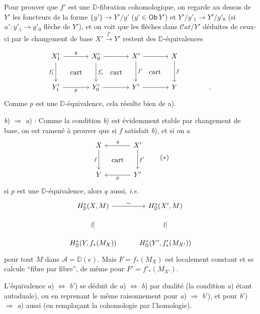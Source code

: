 \documentclass[11pt]{article}
\newcommand{\printedpage}[1]{\marginpar{\footnotesize p.~#1}}
\newcommand{\msp}[1]{\marginpar{\footnotesize [#1]}}
\newcommand{\DD}{\mathbb{D}}
\newcommand{\Ob}{\mathsf{Ob}}
\newcommand{\Cat}{\mathcal{C}at}
\begin{document}
\printedpage{49}

Pour prouver que $f'$ est une $\DD$-fibration cohomologique, on regarde au dessus de $Y'$ les foncteurs de la forme $\{y'\} \to Y'/y'$ ($y' \in \Ob\, Y'$) et $Y'/y'_1 \to Y'/y'_0$ (si $u' : y'_1 \to y'_0$ flèche de $Y'$), et on voit que les flèches dans $\Cat/Y'$ déduites de ceux-ci par le changement de base $X' \xrightarrow{f'} Y'$ restent des $\DD$-équivalences

\msp{page 80}

\[
\begin{tikzcd}[column sep=large, row sep=large]
X'_1 \arrow[r, "q"] \arrow[d, "f'_1"'] \arrow[dr, phantom, "\text{cart}"] & X'_0 \arrow[r] \arrow[d, "f'_0"] \arrow[dr, phantom, "\text{cart}"] & X' \arrow[r] \arrow[d, "f'"] \arrow[dr, phantom, "\text{cart}"] & X \arrow[d, "f"] \\
Y'_1 \arrow[r, "p"'] & Y'_0 \arrow[r] & Y' \arrow[r] & Y & .
\end{tikzcd}
\]
Comme $p$ est une $\DD$-équivalence, cela résulte bien de a).

\indent\textit{b}) $\Rightarrow$ \textit{a}) : Comme la condition \textit{b}) est évidemment stable par changement de base, on est ramené à prouver que si $f$ satisfait \textit{b}), et si on a
\[
\begin{tikzcd}[column sep=large, row sep=large]
X \arrow[d, "f"'] \arrow[dr, phantom, "\text{cart}"] & X' \arrow[l, "q"'] \arrow[d, "f'"] \\
Y & Y' \arrow[l, "p"]
\end{tikzcd}
\tag*{$(*)$}
\]
si $p$ est une $\DD$-équivalence, alors $q$ aussi, \textit{i.e.}
\[
\begin{tikzcd}[row sep=small]
H^*_{\DD}(X,M) \arrow[r, "\sim"] & H^*_{\DD}(X',M) \\
\wr| & \wr| \\
H^*_{\DD}(Y, f_*(M_X)) & H^*_{\DD}(Y', f'_*(M_{X'}))
\end{tikzcd}
\]
pour tout $M$ dans $\mathcal{A} = \DD(e)$. Mais $F = f_*(M_X)$ est localement constant et se calcule “fibre par fibre”, de même pour $F' = f'_*(M_{X'})$.

\msp{page 81}

L'équivalence \textit{a}) $\Leftrightarrow$ \textit{b}$'$) se déduit de \textit{a}) $\Leftrightarrow$ \textit{b}) par dualité (la condition \textit{a}) étant autoduale), ou en reprenant le même raisonnement pour \textit{a}) $\Rightarrow$ \textit{b}$'$), et pour \textit{b}$'$) $\Rightarrow$ \textit{a}) aussi (en remplaçant la cohomologie par l'homologie).
\end{document}

